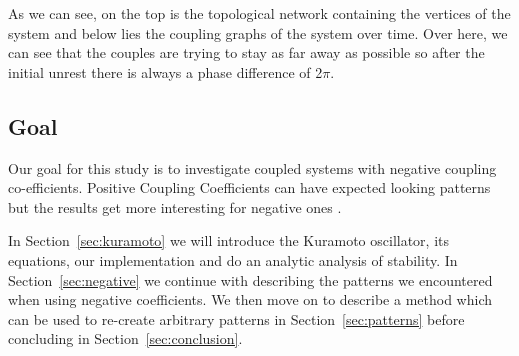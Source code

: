 As we can see, on the top is the topological network containing the vertices of the system and below lies the coupling graphs of the system over time. Over here, we can see that the couples are trying to stay as far away as possible so after the initial unrest there is always a phase difference of 2$\pi$. 

\subsection{Goal}
Our goal for this study is to investigate coupled systems with negative coupling co-efficients. Positive Coupling Coefficients can have expected looking patterns but the results get more interesting for negative ones . 

In Section~\ref{sec:kuramoto} we will introduce the Kuramoto oscillator, its equations, our implementation and do an analytic analysis of stability. In Section~\ref{sec:negative} we continue with describing the patterns we encountered when using negative coefficients. We then move on to describe a method which can be used to re-create arbitrary patterns in Section~\ref{sec:patterns} before concluding in Section~\ref{sec:conclusion}. 
